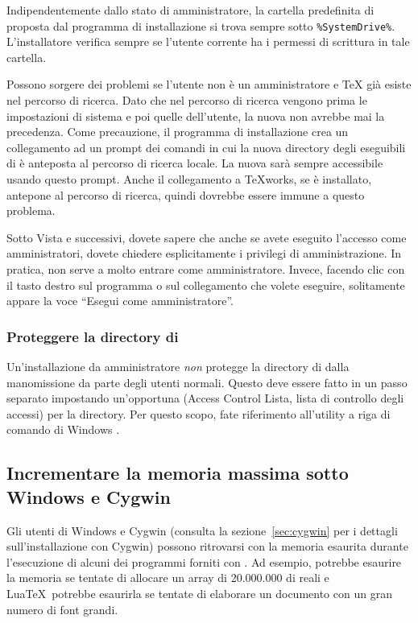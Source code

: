 \documentclass{article}
\begin{document}
Indipendentemente dallo stato di amministratore, la cartella predefinita
di \TL{} proposta dal programma di installazione si trova sempre sotto
\verb|%SystemDrive%|. L'installatore verifica sempre se l'utente corrente
ha i permessi di scrittura in tale cartella.

Possono sorgere dei problemi se l'utente non è un amministratore e \TeX{}
già esiste nel percorso di ricerca. Dato che nel percorso di ricerca
vengono prima le impostazioni di sistema e poi quelle dell'utente, la
nuova \TL{} non avrebbe mai la precedenza. Come precauzione, il programma
di installazione crea un collegamento ad un prompt dei comandi in cui la
nuova directory degli eseguibili di \TL{} è anteposta al percorso di
ricerca locale. La nuova \TL{} sarà sempre accessibile usando questo
prompt. Anche il collegamento a \TeX{}works, se è installato, antepone
\TL{} al percorso di ricerca, quindi dovrebbe essere immune a questo
problema.

Sotto Vista e successivi, dovete sapere che anche se avete
eseguito l'accesso come amministratori, dovete chiedere esplicitamente i
privilegi di amministrazione. In pratica, non serve a molto entrare come
amministratore. Invece, facendo clic con il tasto destro sul programma o
sul collegamento che volete eseguire, solitamente appare la voce ``Esegui
come amministratore''.

\subsubsection{Proteggere la directory di \TL{}}

Un'installazione da amministratore \emph{non} protegge la directory di
\TL{} dalla manomissione da parte degli utenti normali. Questo deve essere
fatto in un passo separato impostando un'opportuna  (Access
Control Lista, lista di controllo degli accessi) per la directory. Per
questo scopo, fate riferimento all'utility a riga di comando di Windows
.


\subsection{Incrementare la memoria massima sotto Windows e Cygwin}
\label{sec:cygwin-maxmem}

Gli utenti di Windows e Cygwin (consulta la sezione~\ref{sec:cygwin} per i
dettagli sull'installazione con Cygwin) possono ritrovarsi con la memoria
esaurita durante l'esecuzione di alcuni dei programmi forniti con \TL. Ad
esempio,  potrebbe esaurire la memoria se tentate di allocare un
array di 20.000.000 di reali e Lua\TeX\ potrebbe esaurirla se tentate di
elaborare un documento con un gran numero di font grandi.
\end{document}
